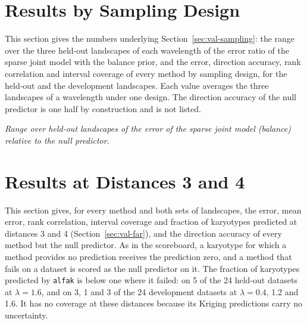 \documentclass[11pt]{article}
\begin{document}
\section{Results by Sampling Design}
\label{sec:s-designs}

This section gives the numbers underlying Section~\ref{sec:val-sampling}: the
range over the three held-out landscapes of each wavelength of the error ratio
of the sparse joint model with the balance prior, and the error, direction
accuracy, rank correlation and interval coverage of every method by sampling
design, for the held-out and the development landscapes. Each value averages
the three landscapes of a wavelength under one design. The direction accuracy
of the null predictor is one half by construction and is not listed.

\noindent\textit{Range over held-out landscapes of the error of the sparse
joint model (balance) relative to the null predictor.}







\section{Results at Distances 3 and 4}
\label{sec:s-far}

This section gives, for every method and both sets of landscapes, the error,
mean error, rank correlation, interval coverage and fraction of karyotypes
predicted at distances 3 and 4 (Section~\ref{sec:val-far}), and the direction
accuracy of every method but the null predictor. As in the scoreboard, a
karyotype for which a method provides no prediction receives the prediction
zero, and a method that fails on a dataset is scored as the null predictor on
it. The fraction of
karyotypes predicted by \texttt{alfak} is below one where it failed: on 5 of
the 24 held-out datasets at $\lambda=1.6$, and on 3, 1 and 3 of the 24
development datasets at $\lambda=0.4$, 1.2 and 1.6. It has no coverage at
these distances because its Kriging predictions carry no uncertainty.


\end{document}
